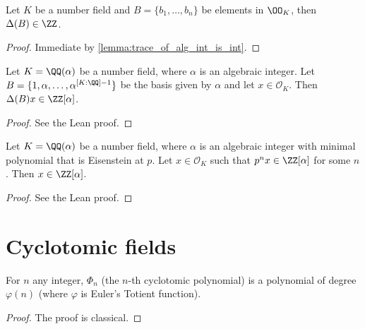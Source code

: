 \begin{lemma}\label{lemma:int_basis_int_disc}
	\leanok
	Let $K$ be a number field and $B=\{b_1,\dots,b_n\}$ be elements in $\OO_K$, then $\Delta(B) \in \ZZ$.
\end{lemma}
\begin{proof}
	\leanok
	Immediate by \ref{lemma:trace_of_alg_int_is_int}.
\end{proof}


\begin{lemma}\label{lemma:disc_int_basis}
	\leanok
	Let $K = \QQ(\alpha)$ be a number field, where $\alpha$ is an algebraic integer. Let $B = \{1, \alpha, \ldots, \alpha^{[K : \QQ] - 1} \}$ be the basis given by $\alpha$ and let $x \in \mathcal{O}_K$. Then $\Delta(B)x \in \ZZ[\alpha]$.
\end{lemma}

\begin{proof}
	\leanok
	See the Lean proof.
\end{proof}

\begin{lemma}\label{lemma:eis_crit_and_alg_ints}
	\leanok
	Let $K = \QQ(\alpha)$ be a number field, where $\alpha$ is an algebraic integer with minimal polynomial that is Eisenstein at $p$. Let $x \in \mathcal{O}_K$ such that $p^n x \in \ZZ[\alpha]$ for some $n$. Then $x \in \ZZ[\alpha]$.
\end{lemma}
\begin{proof}
	\leanok
	See the Lean proof.
\end{proof}

\section{Cyclotomic fields}

\begin{lemma}\label{lemma:cyclo_poly_deg}
	\leanok
	For $n$ any integer, $\Phi_n$ (the $n$-th cyclotomic polynomial) is a polynomial of degree $\varphi(n)$ (where $\varphi$ is Euler's Totient function).
\end{lemma}
\begin{proof}
	\leanok
	The proof is classical.
\end{proof}


